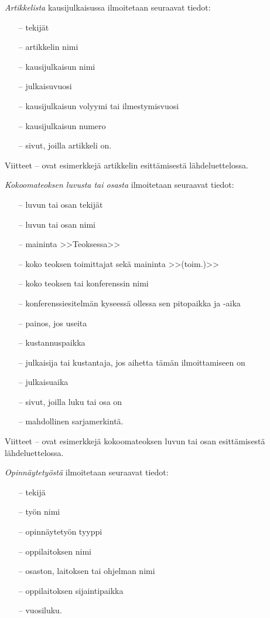 \documentclass[english,12pt,a4paper,pdftex,elec,utf8]{aaltothesis}
\begin{document}
\textit{Artikkelista} kausijulkaisussa ilmoitetaan seuraavat tiedot:

\begin{itemize}

\item[--]tekij\"at
\item[--]artikkelin nimi
\item[--]kausijulkaisun nimi
\item[--]julkaisuvuosi
\item[--]kausijulkaisun volyymi tai ilmestymisvuosi
\item[--]kausijulkaisun numero
\item[--]sivut, joilla artikkeli on.
\end{itemize}

Viitteet \cite{bcs}--\cite{Deschamps} ovat esimerkkej\"a artikkelin
esitt\"amisest\"a l\"ahdeluettelossa.

\textit{Kokoomateoksen luvusta tai osasta} ilmoitetaan seuraavat tiedot:

\begin{itemize}
\item[--]luvun tai osan tekij\"at
\item[--]luvun tai osan nimi
\item[--]maininta >>Teoksessa>>
\item[--]koko teoksen toimittajat sek\"a maininta >>(toim.)>>
\item[--]koko teoksen tai konferenssin nimi
\item[--]konferenssiesitelm\"an kyseess\"a ollessa sen pitopaikka ja -aika
\item[--]painos, jos useita
\item[--]kustannuspaikka
\item[--]julkaisija tai kustantaja, jos aihetta t\"am\"an ilmoittamiseen on
\item[--]julkaisuaika
\item[--]sivut, joilla luku tai osa on
\item[--]mahdollinen sarjamerkint\"a.
\end{itemize}

Viitteet \cite{Sihvola}--\cite{Lindblom} ovat esimerkkej\"a
kokoomateoksen luvun tai osan esitt\"amisest\"a l\"ahdeluettelossa.

\textit{Opinn\"aytety\"ost\"a} ilmoitetaan seuraavat tiedot:

\begin{itemize}
\item[--]tekij\"a
\item[--]ty\"on nimi
\item[--]opinn\"aytety\"on tyyppi
\item[--]oppilaitoksen nimi
\item[--]osaston, laitoksen tai ohjelman nimi
\item[--]oppilaitoksen sijaintipaikka
\item[--]vuosiluku.
\end{itemize}
\end{document}
